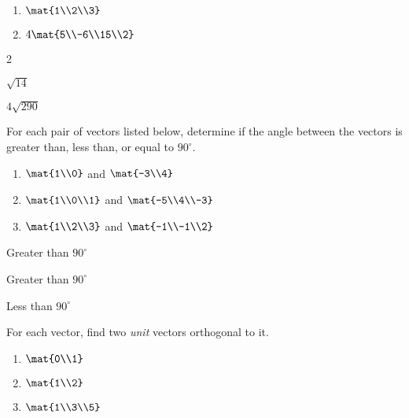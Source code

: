 \begin{exercises}
\begin{problist}
\begin{enumerate}
			\item $\mat{1\\2\\3}$
			\item $4\mat{5\\-6\\15\\2}$
		\end{enumerate}
		\begin{solution}
			\begin{enumerate*}
				\item 2 
				\item $\sqrt{14}$ 
				\item $4\sqrt{290}$ 
			\end{enumerate*}
		\end{solution}
		\prob For each pair of vectors listed below, determine if the angle between the vectors is greater than,
		less than, or equal to $90^\circ$.
		\begin{enumerate}
			\item $\mat{1\\0}$ and $\mat{-3\\4}$
			\item $\mat{1\\0\\1}$ and $\mat{-5\\4\\-3}$
			\item $\mat{1\\2\\3}$ and $\mat{-1\\-1\\2}$
		\end{enumerate}
		\begin{solution}
			\begin{enumerate*}
				\item Greater than $90^\circ$
				\item Greater than $90^\circ$
				\item Less than $90^\circ$
			\end{enumerate*}
		\end{solution}
		\prob For each vector, find two \emph{unit} vectors orthogonal to it.
		\begin{enumerate}
			\item $\mat{0\\1}$
			\item $\mat{1\\2}$
			\item $\mat{1\\3\\5}$

\end{enumerate}
\end{problist}
\end{exercises}
